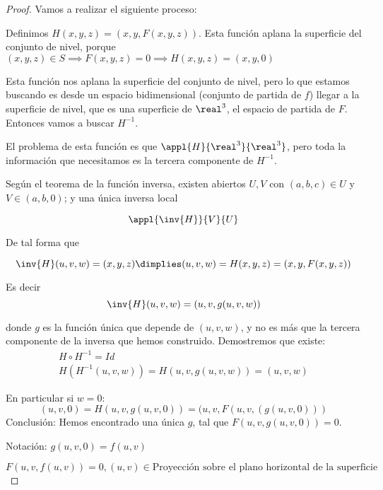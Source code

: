 \begin{proof} Vamos a realizar el siguiente proceso:

Definimos $H(x,y,z) = (x,y,F(x,y,z))$. Esta función aplana la superficie del conjunto de nivel, porque $(x,y,z) \in S \implies F(x,y,z)=0 \implies H(x,y,z) = (x,y,0)$

Esta función nos aplana la superficie del conjunto de nivel, pero lo que estamos buscando es desde un espacio bidimensional (conjunto de partida de $f$) llegar a la superficie de nivel, que es una superficie de $\real^3$, el espacio de partida de $F$. Entonces vamos a buscar $H^{-1}$.

El problema de esta función es que $\appl{H}{\real^3}{\real^3}$, pero toda la información que necesitamos es la tercera componente de $H^{-1}$.

Según el teorema de la función inversa, existen abiertos $U, V$ con $(a,b,c) \in U$ y  $V\in (a,b,0)$; y una única inversa local

\[ \appl{\inv{H}}{V}{U} \]

De tal forma que

\[ \inv{H}(u,v,w) = (x,y,z) \dimplies (u,v,w) = H(x,y,z) = (x,y,F(x,y,z)) \]

Es decir \[ \inv{H} (u,v,w) = (u,v,g(u,v,w)) \]

donde $g$ es la función única que depende de $(u,v,	w)$, y no es más que la tercera componente de la inversa que hemos construido. Demostremos que existe:
 \begin{gather*}
 H\circ H^{-1} = Id \\
 H(H^{-1}(u,v,w)) = H(u,v,g(u,v,w)) = (u,v,w)
 \end{gather*}

 En particular si $w=0$:
 $$(u,v,0) = H(u,v,g(u,v,0)) = (u,v,F(u,v,(g(u,v,0)))$$
 Conclusión: Hemos encontrado una única $g$, tal que $F(u,v,g(u,v,0)) = 0$.

  Notación: $g(u,v,0) = f(u,v)$

  $F(u,v,f(u,v)) = 0, (u,v) \in \text{Proyección sobre el plano horizontal de la superficie}$

\end{proof}

